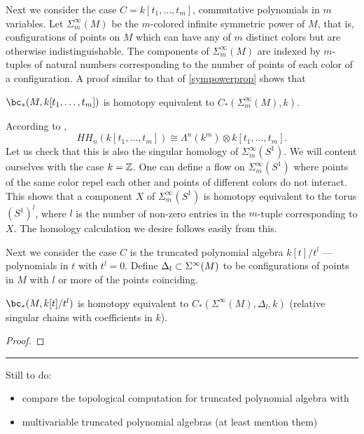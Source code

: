 \medskip

Next we consider the case $C = k[t_1, \ldots, t_m]$, commutative polynomials in $m$ variables.
Let $\Sigma_m^\infty(M)$ be the $m$-colored infinite symmetric power of $M$, that is, configurations
of points on $M$ which can have any of $m$ distinct colors but are otherwise indistinguishable.
The components of $\Sigma_m^\infty(M)$ are indexed by $m$-tuples of natural numbers
corresponding to the number of points of each color of a configuration.
A proof similar to that of \ref{sympowerprop} shows that

\begin{prop}
$\bc_*(M, k[t_1, \ldots, t_m])$ is homotopy equivalent to $C_*(\Sigma_m^\infty(M), k)$.
\end{prop}

According to \cite[3.2.2]{MR1600246},
\[
	HH_n(k[t_1, \ldots, t_m]) \cong \Lambda^n(k^m) \otimes k[t_1, \ldots, t_m] .
\]
Let us check that this is also the singular homology of $\Sigma_m^\infty(S^1)$.
We will content ourselves with the case $k = \mathbb{Z}$.
One can define a flow on $\Sigma_m^\infty(S^1)$ where points of the 
same color repel each other and points of different colors do not interact.
This shows that a component $X$ of $\Sigma_m^\infty(S^1)$ is homotopy equivalent
to the torus $(S^1)^l$, where $l$ is the number of non-zero entries in the $m$-tuple
corresponding to $X$.
The homology calculation we desire follows easily from this.


\medskip

Next we consider the case $C$ is the truncated polynomial
algebra $k[t]/t^l$ --- polynomials in $t$ with $t^l = 0$.
Define $\Delta_l \subset \Sigma^\infty(M)$ to be configurations of points in $M$ with $l$ or
more of the points coinciding.

\begin{prop}
$\bc_*(M, k[t]/t^l)$ is homotopy equivalent to $C_*(\Sigma^\infty(M), \Delta_l, k)$
(relative singular chains with coefficients in $k$).
\end{prop}

\begin{proof}
\end{proof}

\medskip
\hrule
\medskip

Still to do:
\begin{itemize}
\item compare the topological computation for truncated polynomial algebra with \cite{MR1600246}
\item multivariable truncated polynomial algebras (at least mention them)
\end{itemize}

